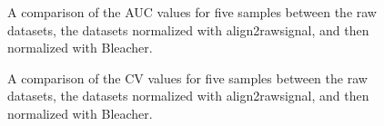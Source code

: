 \documentclass[a4paper]{article}
\begin{document}
  \begin{figure}[htp]
    \caption{A comparison of the AUC values for five samples between the raw datasets, the datasets normalized with align2rawsignal, and then normalized with Bleacher.}
    \label{fig:3}
  \end{figure}

  \begin{figure}[htp]
    \caption{A comparison of the CV values for five samples between the raw datasets, the datasets normalized with align2rawsignal, and then normalized with Bleacher.}
    \label{fig:4}
  \end{figure}
\end{document}
